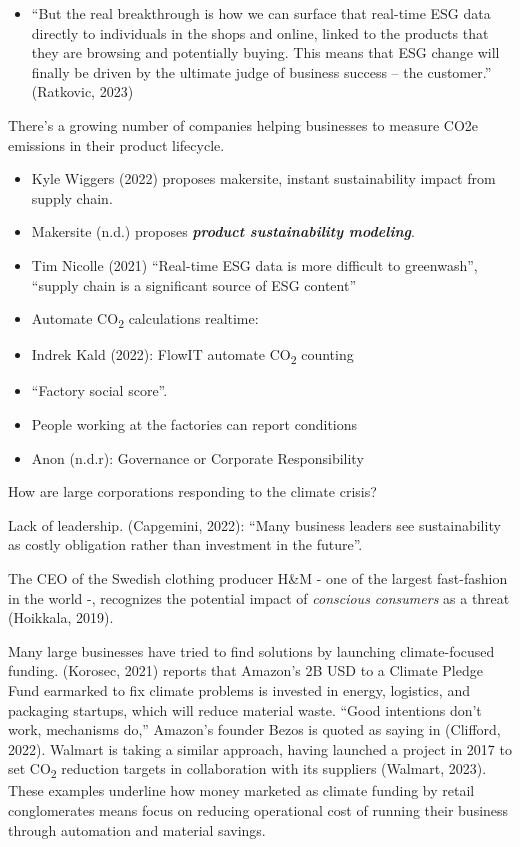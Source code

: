 \documentclass[
  letterpaper,
  DIV=11,
  numbers=noendperiod]{scrartcl}
\providecommand{\tightlist}{%
  \setlength{\itemsep}{0pt}\setlength{\parskip}{0pt}}\usepackage{longtable,booktabs,array}
\begin{document}
\begin{itemize}
\tightlist
\item
  ``But the real breakthrough is how we can surface that real-time ESG
  data directly to individuals in the shops and online, linked to the
  products that they are browsing and potentially buying. This means
  that ESG change will finally be driven by the ultimate judge of
  business success -- the customer.'' (Ratkovic, 2023)
\end{itemize}

There's a growing number of companies helping businesses to measure CO2e
emissions in their product lifecycle.

\begin{itemize}
\item
  Kyle Wiggers (2022) proposes makersite, instant sustainability impact
  from supply chain.
\item
  Makersite (n.d.) proposes \textbf{\emph{product sustainability
  modeling}}.
\item
  Tim Nicolle (2021) ``Real-time ESG data is more difficult to
  greenwash'', ``supply chain is a significant source of ESG content''
\item
  Automate CO\textsubscript{2} calculations realtime:
\item
  Indrek Kald (2022): FlowIT automate CO\textsubscript{2} counting
\item
  ``Factory social score''.
\item
  People working at the factories can report conditions
\item
  Anon (n.d.r): Governance or Corporate Responsibility
\end{itemize}

How are large corporations responding to the climate crisis?

Lack of leadership. (Capgemini, 2022): ``Many business leaders see
sustainability as costly obligation rather than investment in the
future''.

The CEO of the Swedish clothing producer H\&M - one of the largest
fast-fashion in the world -, recognizes the potential impact of
\emph{conscious consumers} as a threat (Hoikkala, 2019).

Many large businesses have tried to find solutions by launching
climate-focused funding. (Korosec, 2021) reports that Amazon's 2B USD to
a Climate Pledge Fund earmarked to fix climate problems is invested in
energy, logistics, and packaging startups, which will reduce material
waste. ``Good intentions don't work, mechanisms do,'' Amazon's founder
Bezos is quoted as saying in (Clifford, 2022). Walmart is taking a
similar approach, having launched a project in 2017 to set
CO\textsubscript{2} reduction targets in collaboration with its
suppliers (Walmart, 2023). These examples underline how money marketed
as climate funding by retail conglomerates means focus on reducing
operational cost of running their business through automation and
material savings.
\end{document}
